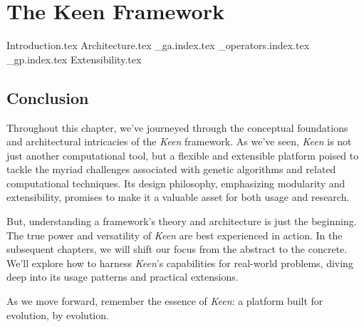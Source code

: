 
\chapter{The Keen Framework}
\label{chap:keen}
  {Introduction.tex}
  {Architecture.tex}
  {_ga.index.tex}
  {_operators.index.tex}
  {_gp.index.tex}
  {Extensibility.tex}


  \section{Conclusion}
  \label{sec:keen:conclusion}
    Throughout this chapter, we've journeyed through the conceptual foundations 
    and architectural intricacies of the \textit{Keen} framework. As we've seen, 
    \textit{Keen} is not just another computational tool, but a flexible and 
    extensible platform poised to tackle the myriad challenges associated with 
    genetic algorithms and related computational techniques. Its design 
    philosophy, emphasizing modularity and extensibility, promises to make it a 
    valuable asset for both usage and research.

    But, understanding a framework's theory and architecture is just the 
    beginning. The true power and versatility of \textit{Keen} are best 
    experienced in action. In the subsequent chapters, we will shift our focus 
    from the abstract to the concrete. We'll explore how to harness 
    \textit{Keen}'s capabilities for real-world problems, diving deep into its 
    usage patterns and practical extensions.

    As we move forward, remember the essence of \textit{Keen}: a platform built 
    for evolution, by evolution.